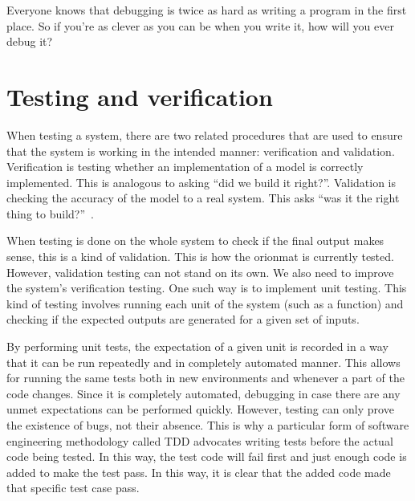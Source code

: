 

\begin{savequote}[0.55\linewidth]
	\begin{fancyquote}
		Everyone knows that debugging is twice as hard as writing a program in the
		first place. So if you're as clever as you can be when you write it, how will
		you ever debug it?
	\end{fancyquote}
\end{savequote}
\chapter{Testing and verification}\label{ch:testing}

When testing a system, there are two related procedures that are
used to ensure that the system is working in the intended manner:
verification and validation. Verification is testing whether an
implementation of a model is correctly implemented. This is analogous to
asking  ``did we build it right?''. Validation is checking the accuracy of the model to
a real system. This asks ``was it the right thing to build?''~\autocite{Boehm:1989}.

When testing is done on the whole system to check if the final output makes
sense, this is a kind of validation. This is how the \gls{orionmat} is
currently tested. However, validation testing can not stand on its own. We also
need to improve the system's verification testing. One such way is to implement
unit testing. This kind of testing involves running each unit of the system (such as a function)
and checking if the expected outputs are generated for a given set of inputs.

By performing unit tests, the expectation of a given unit is recorded in a way
that it can be run repeatedly and in completely automated manner. This allows
for running the same tests both in new environments and whenever a part of the
code changes. Since it is completely automated, debugging in case there are any
unmet expectations can be performed quickly. However, testing can only prove
the existence of bugs, not their absence. This is why a particular form of
software engineering methodology called \acrfull{TDD} advocates
writing tests before the actual code being tested. In this way, the test code
will fail first and just enough code is added to make the test pass. In this way,
it is clear that the added code made that specific test case pass.

